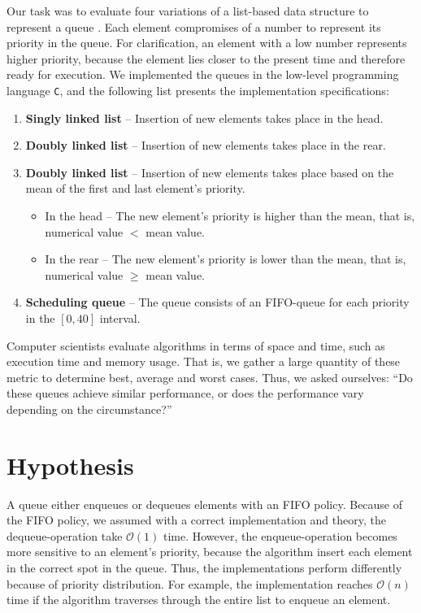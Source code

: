 \documentclass[a4paper,11pt]{kth-mag}
\newcommand*{\skippara}{\par\vspace{\baselineskip} \noindent}
\begin{document}
\skippara Our task was to evaluate four variations of a list-based data structure to represent a queue \cite{Uppgiftl9:online}.
Each element compromises of a number to represent its priority in the queue.
For clarification, an element with a low number represents higher priority, because the element lies closer to the present time and therefore ready for execution.
We implemented the queues in the low-level programming language \texttt{C}, and the following list presents the implementation specifications:
\begin{enumerate}
    \item \textbf{Singly linked list} -- Insertion of new elements takes place in the head.
    \item \textbf{Doubly linked list} -- Insertion of new elements takes place in the rear.
        \item \textbf{Doubly linked list} -- Insertion of new elements takes place based on the mean of the first and last element's priority.
        \begin{itemize}
            \item In the head -- The new element's priority is higher than the mean, that is, \\numerical value $<$ mean value.
            \item In the rear -- The new element's priority is lower than the mean, that is,\\numerical value $\ge$ mean value.
        \end{itemize}
    \item \textbf{Scheduling queue} -- The queue consists of an FIFO-queue for each priority in the $[0,40]$ interval.
\end{enumerate}

\skippara 
Computer scientists evaluate algorithms in terms of space and time, such as execution time and memory usage.
That is, we gather a large quantity of these metric to determine best, average and worst cases.
Thus, we asked ourselves: ``Do these queues achieve similar performance, or does the performance vary depending on the circumstance?''


\clearpage
\section{Hypothesis}
A queue either enqueues or dequeues elements with an FIFO policy.
Because of the FIFO policy, we assumed with a correct implementation and theory, the dequeue-operation take $\mathcal{O}(1)$ time.
However, the enqueue-operation becomes more sensitive to an element's priority, because the algorithm insert each element in the correct spot in the queue.
Thus, the implementations perform differently because of priority distribution.
For example, the implementation reaches $\mathcal{O}(n)$ time if the algorithm traverses through the entire list to enqueue an element.
\end{document}
